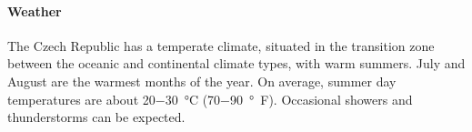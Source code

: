 \documentclass[12pt]{extarticle}
\begin{document}

\paragraph{Weather}
The Czech Republic has a temperate climate, situated in the transition
zone between the oceanic and continental climate types, with warm
summers. July and August are the warmest months of the year. On
average, summer day temperatures are about
\qty[parse-numbers=false]{20-30}{\celsius}
(\qty[parse-numbers=false]{70-90}{\degree F}). Occasional showers and
thunderstorms can be expected.
\end{document}
